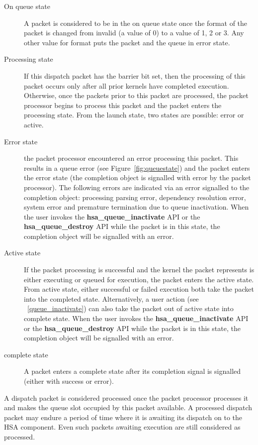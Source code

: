 \documentclass{book}
\newcommand{\reffun}[1]{\textbf{#1}}
\begin{document}
\begin{description}
\item[On queue state] A packet is considered to be in the on queue
state once the format of the packet is changed from invalid (a value
of 0) to a value of 1, 2 or 3. Any other value for format puts the
packet and the queue in error state.

\item[Processing state] If this dispatch packet has the barrier bit
set, then the processing of this packet occurs only after all prior
kernels have completed execution.  Otherwise, once the packets prior
to this packet are processed, the packet processor begins to process
this packet and the packet enters the processing state.  From the
launch state, two states are possible: error or active.

\item[Error state] the packet processor encountered an error
processing this packet. This results in a queue error (see
Figure~\ref{fig:queuestate}) and the packet enters the error state
(the completion object is signalled with error by the packet
processor). The following errors are indicated via an error signalled
to the completion object:
processing parsing error, dependency resolution error, system error
and premature termination due to queue inactivation.
When the user invokes the
\reffun{hsa\_queue\_inactivate} API or the
\reffun{hsa\_queue\_destroy} API while the packet is in this state, the
completion object will be signalled with an error.

\item[Active state] If the packet processing is successful and the
kernel the packet represents is either executing or queued for
execution, the packet enters the active state. From active state,
either successful or failed execution both take the packet into the
completed state.  Alternatively, a user action (see
~\ref{queue_inactivate}) can also take the packet out of
active state into complete state.  When the user invokes the
\reffun{hsa\_queue\_inactivate} API or the
\reffun{hsa\_queue\_destroy} API while the packet is in this state, the
completion object will be signalled with an error.

\item[complete state] A packet enters a complete state after its
completion signal is signalled (either with success or error).
\end{description}

A dispatch packet is considered processed once the packet processor
processes it and makes the queue slot occupied by this packet
available. A processed dispatch packet may endure a period of time
where it is awaiting its dispatch on to the HSA component. Even such
packets awaiting execution are still considered as processed.
\end{document}
